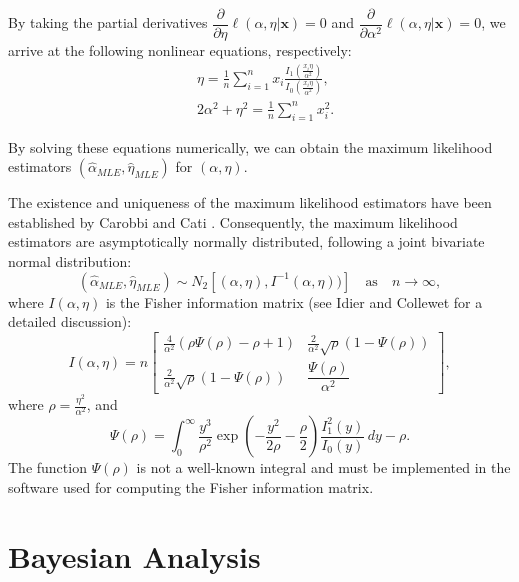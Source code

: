 \documentclass[12pt]{interact}
\theoremstyle{plain}%
\theoremstyle{definition}
\theoremstyle{remark}
\begin{document}
By taking the partial derivatives $\dfrac{\partial}{\partial \eta}\ell(\alpha,\eta|\boldsymbol{x}) = 0$ and $\dfrac{\partial}{\partial \alpha^2}\ell(\alpha,\eta|\boldsymbol{x}) = 0$, we arrive at the following nonlinear equations, respectively:
\begin{align}\label{eq:partial-eta}
    &\eta = \frac{1}{n} \sum_{i=1}^{n} x_i\frac{ I_1(\frac{x_i \eta}{ \alpha^2})}{I_0(\frac{x_i \eta}{ \alpha^2})},\\
    &2\alpha^2 + \eta^2 = \frac{1}{n}\sum_{i=1}^n x_i^2.
    \label{eq:partial-alpha}
\end{align}

By solving these equations numerically, we can obtain the maximum likelihood estimators $\left(\hat{\alpha}_{MLE}, \hat{\eta}_{MLE}\right)$ for $\left(\alpha,\eta\right)$.

The existence and uniqueness of the maximum likelihood estimators have been established by Carobbi and Cati \cite{carobbi2008absolute}. Consequently, the maximum likelihood estimators are asymptotically normally distributed, following a joint bivariate normal distribution:
\begin{equation*}
(\hat{\alpha}_{MLE},\hat{\eta}_{MLE})\sim N_2[(\alpha,\eta),I^{-1}(\alpha,\eta))] \quad \text{as} \quad n \to \infty,
\end{equation*}
where $I(\alpha,\eta)$ is the Fisher information matrix (see Idier and Collewet \cite{idier2014properties} for a detailed discussion):
\begin{equation}\label{mfishernk}
I(\alpha,\eta)=n
\begin{bmatrix}
 \frac{4}{\alpha^2} \left(\rho\Psi(\rho) - \rho + 1\right)  & \frac{2}{\alpha^2}  \sqrt{\rho}\left(1 - \Psi(\rho)\right) \\
\frac{2}{\alpha^2}  \sqrt{\rho}\left(1 - \Psi(\rho)\right) & \dfrac{\Psi(\rho)}{\alpha^2}
\end{bmatrix},
\end{equation}
where $\rho=\frac{\eta^2}{\alpha^2}$, and
\begin{equation}\label{phifunction}
\Psi(\rho) = \int_{0}^{\infty} \frac{y^3}{\rho^2} \exp\left(-\frac{y^2}{2\rho} - \frac{\rho}{2}\right) \frac{I_1^2(y)}{ I_0(y)} \, dy - \rho.
\end{equation}
The function $\Psi(\rho)$ is not a well-known integral and must be implemented in the software used for computing the Fisher information matrix.


\section{Bayesian Analysis}
\end{document}
